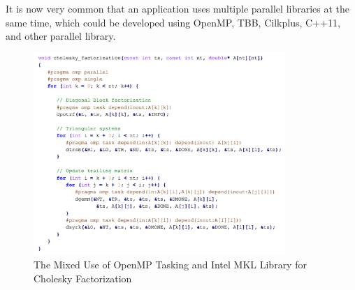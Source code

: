 It is now very common that an application uses multiple parallel libraries at the same time, which could be developed 
using OpenMP, TBB, Cilkplus, C++11, and other parallel library. 

\begin{figure}[h!]
  \centering
      \includegraphics[width=0.85\textwidth]{images/cholesky}
      \caption{The Mixed Use of OpenMP Tasking and Intel MKL Library for Cholesky Factorization~\cite{intertwine}}
 \label{fig:cholesky}
\end{figure}

